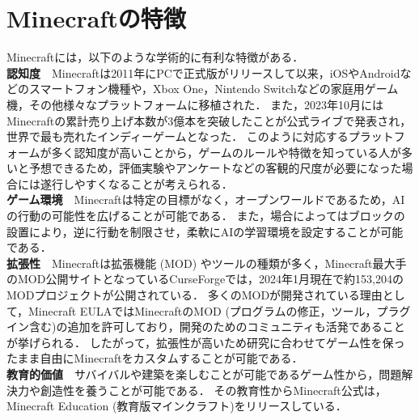 \section{Minecraftの特徴}\label{sec:minecraft_feature}
Minecraftには，以下のような学術的に有利な特徴がある．\\

\textbf{認知度}　Minecraftは2011年にPCで正式版がリリースして以来，iOSやAndroidなどのスマートフォン機種や，Xbox One，Nintendo Switchなどの家庭用ゲーム機，その他様々なプラットフォームに移植された．
また，2023年10月にはMinecraftの累計売り上げ本数が3億本を突破したことが公式ライブで発表され，世界で最も売れたインディーゲームとなった\cite{bib:minecraft_news}．
このように対応するプラットフォームが多く認知度が高いことから，ゲームのルールや特徴を知っている人が多いと予想できるため，評価実験やアンケートなどの客観的尺度が必要になった場合には遂行しやすくなることが考えられる．\\

\textbf{ゲーム環境}　Minecraftは特定の目標がなく，オープンワールドであるため，AIの行動の可能性を広げることが可能である．
また，場合によってはブロックの設置により，逆に行動を制限させ，柔軟にAIの学習環境を設定することが可能である．\\

\textbf{拡張性}　Minecraftは拡張機能 (MOD) やツールの種類が多く，Minecraft最大手のMOD公開サイトとなっているCurseForge\cite{bib:curseforge}では，2024年1月現在で約153,204のMODプロジェクトが公開されている．
多くのMODが開発されている理由として，Minecraft EULA\cite{bib:eula}ではMinecraftのMOD (プログラムの修正，ツール，プラグイン含む)の追加を許可しており，開発のためのコミュニティも活発であることが挙げられる．
したがって，拡張性が高いため研究に合わせてゲーム性を保ったまま自由にMinecraftをカスタムすることが可能である．\\

\textbf{教育的価値}　サバイバルや建築を楽しむことが可能であるゲーム性から，問題解決力や創造性を養うことが可能である．
その教育性からMinecraft公式は，Minecraft Education (教育版マインクラフト)\cite{bib:minecraft_edu}をリリースしている． \\

